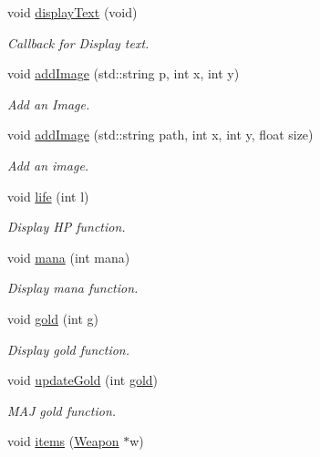 \begin{DoxyCompactItemize}
void \hyperlink{class_h_u_d_window_a12148d8845eaa5a663d816a4befba0dd}{display\+Text} (void)
\begin{DoxyCompactList}\small\item\em Callback for Display text. \end{DoxyCompactList}\item 
void \hyperlink{class_h_u_d_window_a94366d6f68535133a56d0b38228460e0}{add\+Image} (std\+::string p, int x, int y)
\begin{DoxyCompactList}\small\item\em Add an Image. \end{DoxyCompactList}\item 
void \hyperlink{class_h_u_d_window_aee140416af161a6d8acc2b0c83370088}{add\+Image} (std\+::string path, int x, int y, float size)
\begin{DoxyCompactList}\small\item\em Add an image. \end{DoxyCompactList}\item 
void \hyperlink{class_h_u_d_window_a8fc917fbfae792d046e90448c963100a}{life} (int l)
\begin{DoxyCompactList}\small\item\em Display H\+P function. \end{DoxyCompactList}\item 
void \hyperlink{class_h_u_d_window_a6eb79b572849709a329e65ed2afd2e9e}{mana} (int mana)
\begin{DoxyCompactList}\small\item\em Display mana function. \end{DoxyCompactList}\item 
void \hyperlink{class_h_u_d_window_a4eb34de71e2ea671f637381ac255edab}{gold} (int g)
\begin{DoxyCompactList}\small\item\em Display gold function. \end{DoxyCompactList}\item 
void \hyperlink{class_h_u_d_window_a426914dc711c65337a55b44c188d1636}{update\+Gold} (int \hyperlink{class_h_u_d_window_a4eb34de71e2ea671f637381ac255edab}{gold})
\begin{DoxyCompactList}\small\item\em M\+A\+J gold function. \end{DoxyCompactList}\item 
void \hyperlink{class_h_u_d_window_a9edf25a0b1cf568aa3f338281d81d99a}{items} (\hyperlink{class_weapon}{Weapon} $\ast$w)

\end{DoxyCompactItemize}
